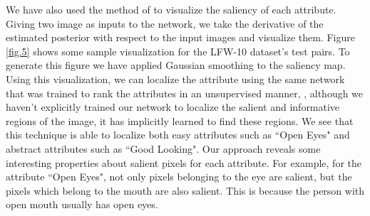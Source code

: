 We have also used the method of \cite{saliency} to visualize the saliency of each attribute. Giving two image as inputs to the network, we take the derivative of the estimated posterior with respect to the input images and visualize them. Figure \ref{fig.5} shows some sample visualization for the LFW-10 dataset's test pairs. To generate this figure we have applied Gaussian smoothing to the saliency map.
Using this visualization, we can localize the attribute using the same network that was trained to rank the attributes in an unsupervised manner, \ie, although we haven't explicitly trained our network to localize the salient and informative regions of the image, it has implicitly learned to find these regions. We see that this technique is able to localize both easy attributes such as ``Open Eyes" and abstract attributes such as ``Good Looking". Our approach reveals some interesting properties about salient pixels for each attribute. For example, for the attribute ``Open Eyes", not only pixels belonging to the eye are salient, but the pixels which belong to the mouth are also salient. This is because the person with open mouth usually has open eyes.

